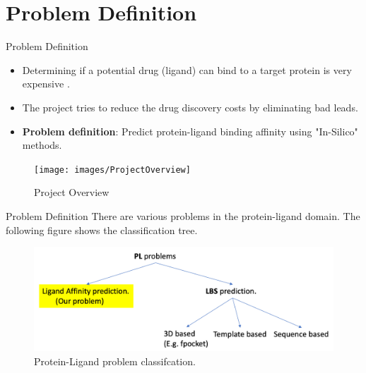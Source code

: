 \documentclass{beamer}
\begin{document}
\section{Problem Definition}

\begin{frame}[t]{Problem Definition}

\begin{itemize}
\item Determining if a potential drug (ligand) can bind to a target protein is very expensive \cite{drugdiscoverycost}.
\item The project tries to reduce the drug discovery costs by eliminating bad leads.
\item \textbf{Problem definition}: Predict protein-ligand binding affinity using "In-Silico" methods. 
\end{itemize}

\begin{figure}[htb]
  \centering
    \texttt{[image: images/ProjectOverview]}
    \caption{Project Overview}
    \label{fig:ProjectOverviewImage}
\end{figure}

\end{frame}

\begin{frame}[t]{Problem Definition}
There are various problems in the protein-ligand domain.  The following figure shows the classification tree.

\begin{figure}[htb]
  \centering
    \includegraphics[scale=0.35]{images/pl_problem_classification}
    \caption{Protein-Ligand problem classifcation.}
    \label{fig:plproblemclassification}
\end{figure}

\end{frame}
\end{document}
